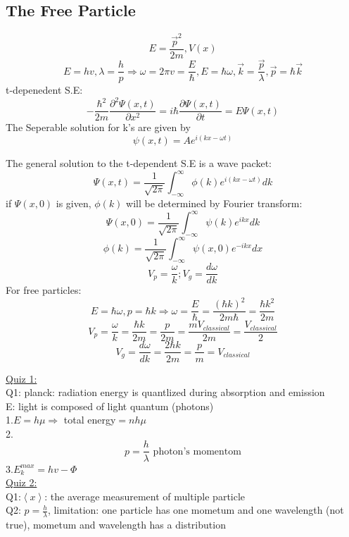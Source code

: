 \documentclass[12pt, a4paper]{article}
\newcommand{\tab}[1][1cm]{\hspace*{#1}}
\begin{document}
\subsection{The Free Particle}
$$E=\frac{\vec{p}^2}{2m}, V(x)$$
$$E=hv,\lambda=\frac{h}{p}\Rightarrow\omega=2\pi v = \frac{E}{\hbar}, E = \hbar \omega, \vec{k}=\frac{\vec{p}}{\lambda}, \vec{p}=\hbar\vec{k}$$
t-depenedent S.E:
$$-\frac{\hbar^2}{2m}\frac{\partial ^2 \Psi(x,t)}{\partial x^2}=i\hbar\frac{\partial \Psi(x,t)}{\partial t}=E\Psi(x,t)$$
The Seperable solution for k's are given by $$\psi(x,t)=Ae^{i(kx-\omega t)}$$

The general solution to the t-dependent S.E is a wave packet:
$$\Psi(x,t)=\frac{1}{\sqrt{2\pi}}\int_{-\infty}^{\infty}\phi(k)e^{i(kx-\omega t)}dk$$
if $\Psi(x,0)$ is given, $\phi(k)$ will be determined by Fourier transform:
$$\Psi(x,0)=\frac{1}{\sqrt{2\pi}}\int_{-\infty}^{\infty}\psi(k)e^{ikx}dk$$
$$\phi(k)=\frac{1}{\sqrt{2\pi}}\int_{-\infty}^{\infty}\psi(x,0)e^{-ikx}dx$$
$$V_p=\frac{\omega}{k};V_g=\frac{d\omega}{dk}$$
For free particles: $$E=\hbar \omega, p=\hbar k\Rightarrow \omega = \frac{E}{\hbar}=\frac{(\hbar k)^2}{2m\hbar}=\frac{\hbar k^2}{2m}$$
$$V_p=\frac{\omega}{k}=\frac{\hbar k}{2m}=\frac{p}{2m}=\frac{m V_{classical}}{2m}=\frac{V_{classical}}{2}$$
$$V_g=\frac{d\omega}{dk}=\frac{2\hbar k}{2m}=\frac{p}{m}=V_{classical}$$


\underline{Quiz 1:}\\
Q1: planck: radiation energy is quantlized during absorption and emission\\
\tab 	E: light is composed of light quantum (photons) \\
1.$E=h\mu\Rightarrow$ total energy$=nh\mu$\\
2.$$p=\frac{h}{\lambda} \text{ photon's momentom}$$
3.$E_k^{max} = hv-\Phi$\\
\underline{Quiz 2:}\\
Q1:$\left<x\right>$: the average measurement of multiple particle \\
Q2: $p=\frac{h}{\lambda}$, limitation: one particle has one mometum and one wavelength (not true), mometum and wavelength has a distribution
\end{document}
